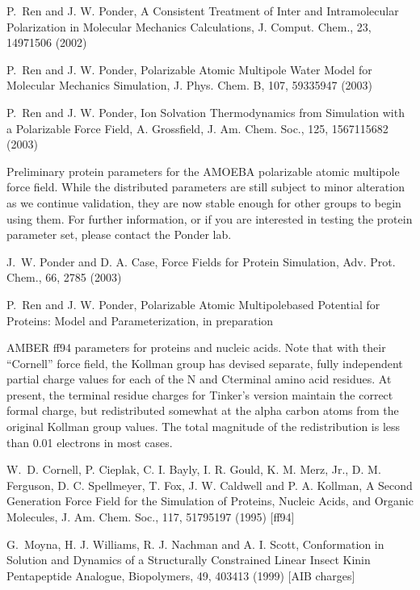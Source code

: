 \documentclass[letterpaper,11pt,english]{sphinxmanual}
\begin{document}
P. Ren and J. W. Ponder, A Consistent Treatment of Inter\sphinxhyphen{} and Intramolecular Polarization in Molecular Mechanics Calculations, J. Comput. Chem., 23, 1497\sphinxhyphen{}1506 (2002)

P. Ren and J. W. Ponder, Polarizable Atomic Multipole Water Model for Molecular Mechanics Simulation, J. Phys. Chem. B, 107, 5933\sphinxhyphen{}5947 (2003)

P. Ren and J. W. Ponder, Ion Solvation Thermodynamics from Simulation with a Polarizable Force Field, A. Grossfield, J. Am. Chem. Soc., 125, 15671\sphinxhyphen{}15682 (2003)


Preliminary protein parameters for the AMOEBA polarizable atomic multipole force field. While the distributed parameters are still subject to minor alteration as we continue validation, they are now stable enough for other groups to begin using them. For further information, or if you are interested in testing the protein parameter set, please contact the Ponder lab.

J. W. Ponder and D. A. Case, Force Fields for Protein Simulation, Adv. Prot. Chem., 66, 27\sphinxhyphen{}85 (2003)

P. Ren and J. W. Ponder, Polarizable Atomic Multipole\sphinxhyphen{}based Potential for Proteins: Model and Parameterization, in preparation


AMBER ff94 parameters for proteins and nucleic acids. Note that with their “Cornell” force field, the Kollman group has devised separate, fully independent partial charge values for each of the N\sphinxhyphen{} and C\sphinxhyphen{}terminal amino acid residues. At present, the terminal residue charges for Tinker’s version maintain the correct formal charge, but redistributed somewhat at the alpha carbon atoms from the original Kollman group values. The total magnitude of the redistribution is less than 0.01 electrons in most cases.

W. D. Cornell, P. Cieplak, C. I. Bayly, I. R. Gould, K. M. Merz, Jr., D. M. Ferguson, D. C. Spellmeyer, T. Fox, J. W. Caldwell and P. A. Kollman, A Second Generation Force Field for the Simulation of Proteins, Nucleic Acids, and Organic Molecules, J. Am. Chem. Soc., 117, 5179\sphinxhyphen{}5197 (1995)  {[}ff94{]}

G. Moyna, H. J. Williams, R. J. Nachman and A. I. Scott, Conformation in Solution and Dynamics of a Structurally Constrained Linear Insect Kinin Pentapeptide Analogue, Biopolymers, 49, 403\sphinxhyphen{}413 (1999)  {[}AIB charges{]}
\end{document}

